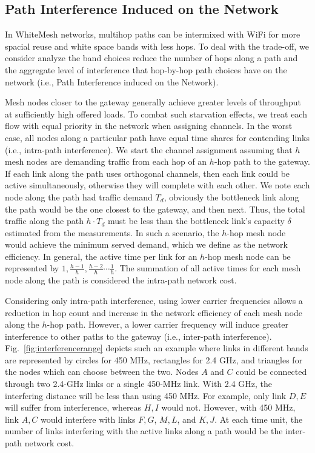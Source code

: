 \subsection{Path Interference Induced on the Network}
\label{subsec:PEN}

In WhiteMesh networks, multihop paths can be intermixed with WiFi 
for more spacial reuse and white space bands with less hops.  
To deal with the trade-off, we consider
analyze the band choices reduce the number of hops along a path and the 
aggregate level of interference that hop-by-hop path choices have
on the network (i.e., Path Interference induced on the Network).

Mesh nodes closer to the gateway generally achieve
greater levels of throughput at sufficiently high offered loads. 
To combat such starvation effects, we treat each flow with equal priority in the network when
assigning channels. In the worst case, all nodes along a particular path have equal 
time shares for contending links (i.e., intra-path interference).
We start the channel assignment assuming that $h$ mesh nodes are demanding
traffic from each hop of an $h$-hop path to the gateway. If each link along the 
path uses orthogonal channels, then each link could be active simultaneously,
otherwise they will complete with each other. 
We note each node along the path had traffic demand $T_d$, obviously the bottleneck 
link along the path would be the one closest to the gateway, and then next. 
Thus, the total traffic along the path $h \cdot T_d$ must be less than the 
bottleneck link's capacity $\delta$ estimated from the measurements. In such a scenario, the $h$-hop mesh node 
would achieve the minimum served demand, which we define as the network efficiency. 
In general, the active time per link for an $h$-hop mesh node can be represented 
by $1,\frac{h-1}{h},\frac{h-2}{h}\cdots \frac{1}{h}$. The summation of all active 
times for each mesh node along the path is considered the intra-path network cost.

Considering only intra-path interference, using lower carrier frequencies allows a
reduction in hop count and increase in the network efficiency of each mesh node along
the $h$-hop path. However, a lower carrier frequency will induce greater interference
to other paths to the gateway (i.e., inter-path interference). 
Fig.~\ref{fig:interferencerange} depicts such an example where
links in different bands are represented by circles for 450 MHz, rectangles for
2.4 GHz, and triangles for the nodes which can choose between the two.
Nodes $A$ and $C$ could be connected through two 2.4-GHz links or a single 450-MHz link.
With 2.4 GHz, the interfering distance will be less than using 450 MHz. For example, only 
link $D,E$ will suffer from interference, whereas $H,I$ would not. However, with 450 MHz,
link $A,C$ would interfere with links $F,G$, $M,L$, and $K,J$. At each time unit, the number of
links interfering with the active links along a path would be the inter-path network cost.


